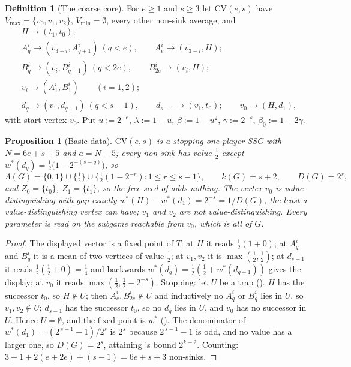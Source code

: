 \documentclass[11pt]{article}
\theoremstyle{plain}
\newtheorem{proposition}[theorem]{Proposition}
\theoremstyle{definition}
\newtheorem{definition}[theorem]{Definition}
\newcommand{\Vmax}{V_{\max}}
\newcommand{\Vmin}{V_{\min}}
\begin{document}
\begin{definition}[The coarse core]\label{def:cv}
For $e\ge1$ and $s\ge3$ let $\mathrm{CV}(e,s)$ have
$\Vmax=\{v_0,v_1,v_2\}$, $\Vmin=\emptyset$, every other non-sink average, and
\[
 \begin{aligned}
  &H\to(t_1,t_0);\\
  &A^{i}_q\to(v_{3-i},A^{i}_{q+1})\ (q<e),\qquad A^{i}_{e}\to(v_{3-i},H);\\
  &B^{i}_q\to(v_{i},B^{i}_{q+1})\ (q<2e),\qquad B^{i}_{2e}\to(v_{i},H);\\
  &v_i\to(A^{i}_1,B^{i}_1)\qquad(i=1,2);\\
  &d_q\to(v_1,d_{q+1})\ (q<s-1),\qquad d_{s-1}\to(v_1,t_0);\qquad
   v_0\to(H,d_1),
 \end{aligned}
\]
with start vertex $v_0$. Put $u:=2^{-e}$, $\lambda:=1-u$, $\beta:=1-u^{2}$,
$\gamma:=2^{-s}$, $\beta_0:=1-2\gamma$.
\end{definition}

\begin{proposition}[Basic data]\label{prop:cv-values}
$\mathrm{CV}(e,s)$ is a stopping one-player SSG with $N=6e+s+5$ and
$a=N-5$; every non-sink has value $\tfrac12$ except
$w^\ast(d_q)=\tfrac12\bigl(1-2^{-(s-q)}\bigr)$, so
\[
  \Lambda(G)=\{0,1\}\cup\{\tfrac12\}\cup
  \{\tfrac12(1-2^{-r}):1\le r\le s-1\},\qquad k(G)=s+2,\qquad D(G)=2^{s},
\]
and $Z_0=\{t_0\}$, $Z_1=\{t_1\}$, so the free seed of  adds
nothing. The vertex $v_0$ is value-distinguishing with gap exactly
$w^\ast(H)-w^\ast(d_1)=2^{-s}=1/D(G)$, the least a value-distinguishing vertex
can have; $v_1$ and $v_2$ are not value-distinguishing. Every parameter is read
on the subgame reachable from $v_0$, which is all of $G$.
\end{proposition}

\begin{proof}
The displayed vector is a fixed point of $T$: at $H$ it reads
$\tfrac12(1+0)$; at $A^{i}_q$ and $B^{i}_q$ it is a mean of two vertices of
value $\tfrac12$; at $v_1,v_2$ it is $\max(\tfrac12,\tfrac12)$; at $d_{s-1}$ it
reads $\tfrac12(\tfrac12+0)=\tfrac14$ and backwards
$w^\ast(d_q)=\tfrac12(\tfrac12+w^\ast(d_{q+1}))$ gives the display; at $v_0$ it
reads $\max(\tfrac12,\tfrac12-2^{-s})$. Stopping: let $U$ be a trap
(). $H$ has the successor $t_0$, so $H\notin U$; then
$A^{i}_e,B^{i}_{2e}\notin U$ and inductively no $A^{i}_q$ or $B^{i}_q$ lies in
$U$, so $v_1,v_2\notin U$; $d_{s-1}$ has the successor $t_0$, so no $d_q$ lies
in $U$, and $v_0$ has no successor in $U$. Hence $U=\emptyset$, and the fixed
point is $w^\ast$ (). The denominator of
$w^\ast(d_1)=(2^{\,s-1}-1)/2^{s}$ is $2^{s}$ because $2^{\,s-1}-1$ is odd, and
no value has a larger one, so $D(G)=2^{s}$, attaining
's bound $2^{k-2}$. Counting:
$3+1+2(e+2e)+(s-1)=6e+s+3$ non-sinks.
\end{proof}
\end{document}
